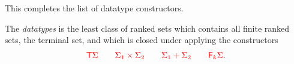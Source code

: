 
 
%
%






\smallskip
\newcommand{\funcitem}[3]{\ranked{#1  } &:& \ranked{#2} \rto  \ranked{#3}}

 This completes the list of  datatype constructors.  
 \begin{definition}[Datatypes]
    \label{def:types}  
        The \emph{datatypes} is the least class of ranked sets which contains all finite ranked sets, the terminal set, and which is closed under applying the constructors 
        \begin{align*}
        {\color{red}{{\color{red}{\mathsf T}}{\color{red}{\Sigma}}\qquad {\color{red}{\Sigma}}_1 \times{\color{red}{\Sigma}}_2 \qquad {\color{red}{\Sigma}}_1 + {\color{red}{\Sigma}}_2 \qquad {\color{red}{\mathsf F_{k}}}{\color{red}{\Sigma}}}}.
        \end{align*}
            \end{definition}


